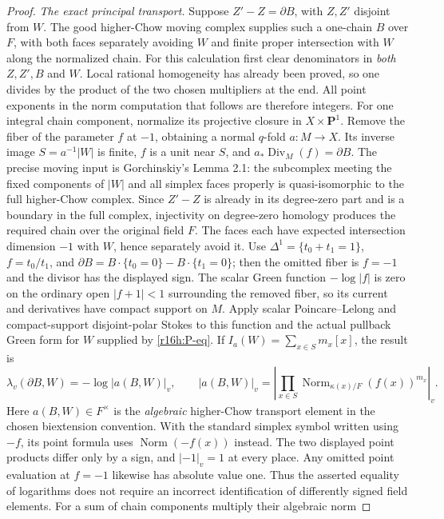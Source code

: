 \begin{proof}
\emph{The exact principal transport.}
Suppose $Z'-Z=\partial B$, with $Z,Z'$ disjoint from $W$. The good
higher-Chow moving complex supplies such a one-chain $B$ over $F$,
with both faces separately
avoiding $W$ and finite proper intersection with $W$ along the
normalized chain. For this calculation first clear denominators in
\emph{both} $Z,Z',B$ and $W$. Local rational homogeneity has already
been proved, so one divides by the product of the two chosen
multipliers at the end. All point exponents in the norm computation
that follows are therefore integers. For one integral chain component, normalize its
projective closure in $X\times\mathbf P^1$. Remove the fiber of
the parameter $f$ at $-1$, obtaining a normal $q$-fold $a:M\to X$.
Its inverse image $S=a^{-1}|W|$ is finite, $f$ is a unit near $S$,
and $a_*\operatorname{Div}_M(f)=\partial B$. The precise moving
input is Gorchinskiy's Lemma 2.1: the subcomplex meeting the fixed
components of $|W|$ and all simplex faces properly is
quasi-isomorphic to the full higher-Chow complex. Since $Z'-Z$ is
already in its degree-zero part and is a boundary in the full
complex, injectivity on degree-zero homology produces the required
chain over the original field $F$. The faces each have expected
intersection dimension $-1$ with $W$, hence separately avoid it.
Use $\Delta^1=\{t_0+t_1=1\}$, $f=t_0/t_1$, and
$\partial B=B\cdot\{t_0=0\}-B\cdot\{t_1=0\}$; then the omitted
fiber is $f=-1$ and the divisor has the displayed sign.
The scalar Green function $-\log|f|$ is zero on the ordinary open
$|f+1|<1$ surrounding the removed fiber, so its current and
derivatives have compact support on $M$. Apply scalar
Poincare--Lelong and compact-support disjoint-polar Stokes to this
function and the actual pullback Green form for $W$ supplied by
\eqref{r16h:P-eq}. If
$I_a(W)=\sum_{x\in S}m_x[x]$, the result is
\[
 \lambda_v(\partial B,W)
       =-\log|a(B,W)|_v,\qquad
 |a(B,W)|_v=
 \left|\prod_{x\in S}\operatorname{Norm}_{\kappa(x)/F}(f(x))^{m_x}\right|_v.
 \tag{H16.12}\label{r16h:principal}
\]
Here $a(B,W)\in F^\times$ is the \emph{algebraic} higher-Chow
transport element in the chosen biextension convention. With the
standard simplex symbol written using $-f$, its point formula uses
$\operatorname{Norm}(-f(x))$ instead. The two displayed point products
differ only by a sign, and $|-1|_v=1$ at every place. Any omitted
point evaluation at $f=-1$ likewise has absolute value one.
Thus the asserted equality of logarithms does not require an
incorrect identification of differently signed field elements.
For a sum of chain components multiply their algebraic norm

\end{proof}

